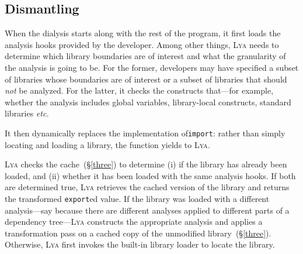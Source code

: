 \documentclass[letterpaper,twocolumn,10pt]{article}
\def\omit#1{}
\def\etc{{\em etc.}\xspace}
\newcommand{\ttt}[1]{\texttt{#1}}
\newcommand{\sx}[1]{(\S\ref{#1})}
\newcommand{\sys}{{\scshape Lya}\xspace}
\newcommand{\pc}{PIC\xspace}
\begin{document}

\subsection{Dismantling}
\label{one}

When the dialysis starts along with the rest of the program, it first loads the analysis hooks provided by the developer. 
Among other things, \sys needs to determine which library boundaries are of interest and what the granularity of the analysis is going to be.
For the former, developers may have specified a subset of libraries whose boundaries are of interest or a subset of libraries that should \emph{not} be analyzed.
For the latter, it checks the constructs that---for example, whether the analysis includes global variables, library-local constructs, standard libraries \etc

It then dynamically replaces the implementation of\ttt{import}:
  rather than simply locating and loading a library, the function yields to \sys.

\sys checks the cache~\sx{three} to determine (i) if the library has already been loaded, and (ii) whether it has been loaded with the same analysis hooks.
If both are determined true, \sys retrieves the cached version of the library and returns the transformed \ttt{export}ed value.
If the library was loaded with a different analysis---say because there are different analyses applied to different parts of a dependency tree---\sys constructs the appropriate analysis and applies a transformation pass on a cached copy of the unmodified library~\sx{three}.
Otherwise, \sys first invokes the built-in library loader to locate the library.
\end{document}
